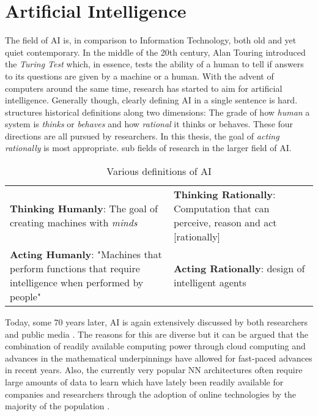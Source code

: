 \section{Artificial Intelligence}%
\label{sec:artificial_intelligence}

The field of \ac {AI} is, in comparison to Information Technology, both old and yet quiet contemporary. In the middle of
the 20th century, Alan Touring introduced the \emph{Turing Test} which, in essence, tests the ability of a human to tell
if answers to its questions are given by a machine or a human. With the advent of computers around the same time,
research has started to aim for artificial intelligence. Generally though, clearly defining \ac {AI} in a single sentence is hard.
\citet{russell2016artificial} structures historical definitions along two dimensions: The grade of how \emph{human} a system is \emph{thinks} or
\emph{behaves} and how \emph{rational} it thinks or behaves. These four directions are all pursued by researchers. In
this thesis, the goal of \emph{acting rationally} is most appropriate. 
sub fields of research in the larger field of \ac {AI}. 

\begin{table}[] 
    \renewcommand{\arraystretch}{2.5}
    \centering
    \begin{tabular}{p{}|p{}} 
        \textbf{Thinking Humanly}: The goal of creating machines with \emph{minds}
&   
        \textbf{Thinking Rationally}: Computation that can perceive, reason and act [rationally]
\\
            \textbf{Acting Humanly}: "Machines that perform functions that require intelligence when performed by people"
&
        \textbf{Acting Rationally}:  design of intelligent agents
    \end{tabular}
    \caption{Various definitions of \ac {AI} \citep{russell2016artificial}  }
    \label{tab:ai_definitions}
\end{table}

Today, some 70 years later, \ac {AI} is again extensively discussed by both researchers and public media
\citep[p.24ff.]{russell2016artificial, arulkumaran2017brief}. The reasons for this are diverse but it can be argued that
the combination of readily available computing power through cloud computing and advances in the mathematical
underpinnings have allowed for fast-paced advances in recent years. Also, the currently very popular \acf {NN}
architectures often require large amounts of data to learn which have lately been readily available for companies and
researchers through the adoption of online technologies by the majority of the population
\citep[p.27]{russell2016artificial}.
